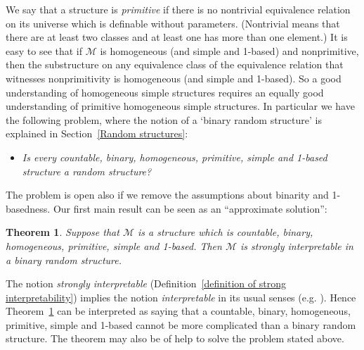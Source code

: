\documentclass[11pt, twoside]{amsart}
\newtheorem{theor}{Theorem}[section]
\numberwithin{equation}{section}
\newcommand{\mcM}{\mathcal{M}}
\begin{document}
We say that a structure is {\em primitive} if there is no nontrivial equivalence relation on its universe which is definable without parameters.
(Nontrivial means that there are at least two classes and at least one has more than one element.)
It is easy to see that if $\mcM$ is homogeneous (and simple and 1-based) and nonprimitive, 
then the substructure on any equivalence class of the equivalence
relation that witnesses nonprimitivity is homogeneous (and simple and 1-based). 
So a good understanding of homogeneous simple structures requires an equally good understanding of
primitive homogeneous simple structures. In particular we have the following problem, where the notion of
a `binary random structure' is explained in Section~\ref{Random structures}:

\begin{itemize}
\item[] {\em Is every countable, binary, homogeneous, primitive, simple and 1-based structure a random structure?}
\end{itemize}

\noindent
The problem is open also if we remove the assumptions about binarity and 1-basedness.
Our first main result can be seen as an ``approximate solution'':

\begin{theor}\label{first main result}
Suppose that $\mcM$ is a structure which is countable, binary, homogeneous, primitive, simple and 1-based.
Then $\mcM$ is strongly interpretable in a  binary random structure.
\end{theor}

\noindent
The notion {\em strongly interpretable} (Definition~\ref{definition of strong interpretability}) 
implies the notion {\em interpretable} in its usual senses (e.g. \cite{Hod, Mac91}).
Hence Theorem~\ref{first main result} can be interpreted as saying that 
a countable, binary, homogeneous, primitive, simple and 1-based cannot be more complicated than 
a binary random structure. The theorem may also be of help to solve the problem stated above.
\end{document}
